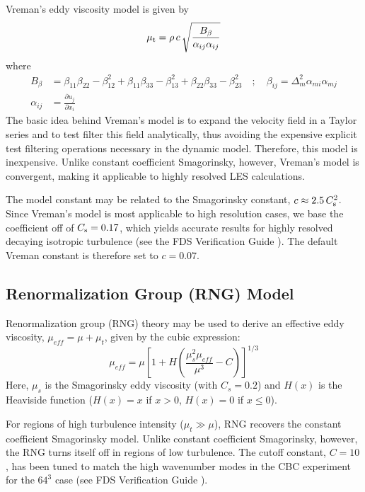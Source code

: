 Vreman's eddy viscosity model \cite{vreman:2004} is given by
\begin{equation}
\label{eqn_mu_vreman}
\mu_{\rm t} = \rho \, c \, \sqrt{ \frac{B_\beta}{\alpha_{ij}\alpha_{ij}} }
\end{equation}
where
\begin{align}
B_\beta     &= \beta_{11}\beta_{22} - \beta_{12}^2 + \beta_{11}\beta_{33} - \beta_{13}^2 + \beta_{22}\beta_{33} - \beta_{23}^2 \quad ; \quad \beta_{ij} = \Delta_m^2 \alpha_{mi} \alpha_{mj} \\
\alpha_{ij} &= \frac{\partial u_j}{\partial x_i}
\end{align}
The basic idea behind Vreman's model is to expand the velocity field in a Taylor series and to test filter this field analytically, thus avoiding the expensive explicit test filtering operations necessary in the dynamic model.  Therefore, this model is inexpensive.  Unlike constant coefficient Smagorinsky, however, Vreman's model is convergent, making it applicable to highly resolved LES calculations.

The model constant may be related to the Smagorinsky constant, $c \approx 2.5 \, C_{\rm s}^2$.  Since Vreman's model is most applicable to high resolution cases, we base the coefficient off of $C_{\rm s} = 0.17$, which yields accurate results for highly resolved decaying isotropic turbulence (see the FDS Verification Guide \cite{FDS_Verification_Guide}).  The default Vreman constant is therefore set to $c = 0.07$.

\subsection{Renormalization Group (RNG) Model}
\label{sec:rng}

Renormalization group (RNG) theory \cite{Yakhot:1989} may be used to derive an effective eddy viscosity, $\mu_{\si{eff}} = \mu + \mu_t$, given by the cubic expression:
\begin{equation}
\label{eq:rng}
\mu_{\si{eff}} = \mu\left[1 + H\left( \frac{\mu_s^2 \mu_{\si{eff}}}{\mu^3} - C \right)\right]^{1/3}
\end{equation}
Here, $\mu_s$ is the Smagorinsky eddy viscosity (with $C_s=0.2$) and $H(x)$ is the Heaviside function ($H(x)=x$ if $x>0$, $H(x)=0$ if $x\le0$).

For regions of high turbulence intensity ($\mu_t \gg \mu$), RNG recovers the constant coefficient Smagorinsky model.  Unlike constant coefficient Smagorinsky, however, the RNG turns itself off in regions of low turbulence.  The cutoff constant, $C=10$, has been tuned to match the high wavenumber modes in the CBC experiment for the $64^3$ case (see FDS Verification Guide \cite{FDS_Verification_Guide}).

